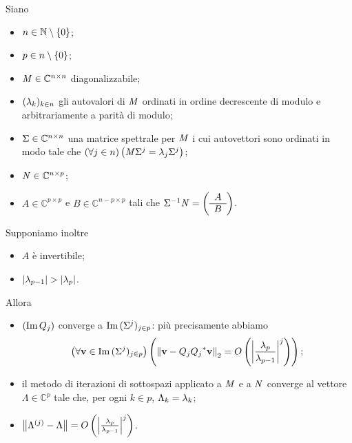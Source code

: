 \begin{Theorem}
  Siano
  \begin{itemize}
    \item $n \in \mathbb{N} \setminus \lbrace 0 \rbrace$;
    \item $p \in n \setminus \lbrace 0 \rbrace$;
    \item $\mathit{M} \in \mathbb{C}^{n \times n}$ diagonalizzabile;
    \item $(\lambda_k)_{k \in n}$ gli autovalori di $\mathit{M}$ ordinati in ordine
      decrescente di modulo e arbitrariamente a parit\`a di modulo;
    \item $\Sigma \in \mathbb{C}^{n \times n}$ una matrice spettrale
      per $\mathit{M}$ i cui autovettori sono ordinati in modo tale che
      $\left ( \forall j \in n \right ) \left ( \mathit{M} \Sigma^j = \lambda_j \Sigma^j \right )$;
    \item $\mathit{N} \in \mathbb{C}^{n \times p}$;
    \item $A \in \mathbb{C}^{p \times p}$ e $B \in \mathbb{C}^{{n - p} \times p}$
      tali che
      $\Sigma^{-1} \mathit{N} =
        \left (
        \begin{array}{c}
          A\\
          \hline
          B
        \end{array}
        \right )$.
  \end{itemize}
  Supponiamo inoltre
  \begin{itemize}
    \item $A$ \`e invertibile;
    \item $\left \lvert \lambda_{p - 1} \right \rvert > \left \lvert \lambda_p \right \rvert$.
  \end{itemize}
  Allora
  \begin{itemize}
    \item $(\operatorname{Im}{Q_j})$ converge a $\operatorname{Im}{(\Sigma^j)_{j \in p}}$:
      pi\`u precisamente abbiamo
      \[
        \ForAll{\Vector \in \Image{(\SpectralBaseChange^j)_{j \in p}}}{
        \Norm{\Vector - Q_j\HermitianTransposed{Q_j} \Vector}[2]
        = \BigO{\AbsoluteValue{\frac{\Eigenvalue_p}{\Eigenvalue_{p - 1}}}^j}};
      \]
    \item il metodo di iterazioni di sottospazi applicato a
      $\mathit{M}$ e a $\mathit{N}$
      converge al vettore
      $\Lambda \in \mathbb{C}^p$ tale che, per ogni $k \in p$,
      $\Lambda_k = \lambda_k$;
    \item $\Norm{\Lambda^{(j)} - \Lambda}
        = \BigO{\AbsoluteValue{\frac{\Eigenvalue_p}{\Eigenvalue_{p - 1}}}^j}$.
  \end{itemize}
\end{Theorem}
